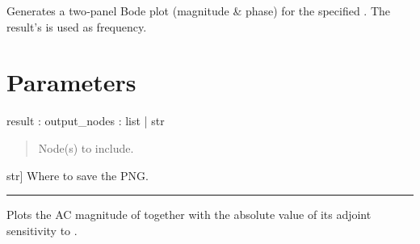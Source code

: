\documentclass[letterpaper,10pt,english]{sphinxmanual}
\begin{document}
\begin{fulllineitems}
\label{\detokenize{plotting:make_bode_plot}}
\pysigstartsignatures
\pysiglinewithargsret
{}
{\sphinxparamcomma {}\sphinxparamcomma {}\sphinxparamcomma {}}
{}
\pysigstopsignatures
\sphinxAtStartPar
Generates a two‑panel Bode plot (magnitude \& phase) for the specified
.  The result’s  is used as frequency.


\section{Parameters}
\label{\detokenize{plotting:parameters}}
\sphinxAtStartPar
result : {\hyperref[\detokenize{results:SimulationResult}]{}}
output\_nodes : list | str
\begin{quote}

\sphinxAtStartPar
Node(s) to include.
\end{quote}
\begin{description}
\sphinxlineitem{folder, name}{[}str{]}
\sphinxAtStartPar
Where to save the PNG.

\end{description}

\end{fulllineitems}



\bigskip\hrule\bigskip



\begin{fulllineitems}

\pysigstartsignatures
\pysigline
{}
\pysigline
{}
\pysigstopsignatures
\sphinxAtStartPar
Plots the AC magnitude of  together with the absolute value of its
adjoint sensitivity to .

\end{fulllineitems}
\end{document}

